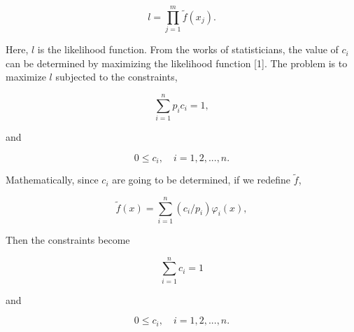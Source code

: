 \documentclass [18pt]{article}
\begin{document}
\begin{equation}
\label{eq10}
l = \prod\limits_{j = 1}^m {\widetilde{f}(x_j )} .
\end{equation}



Here, $l$ is the likelihood function. From the works of statisticians, the
value of $c_i $ can be determined by maximizing the likelihood function [1].
The problem is to maximize $l$ subjected to the constraints,


\begin{equation}
\label{eq11}
\sum\limits_{i = 1}^n {p_i c_i = 1} ,
\end{equation}



\noindent
and


\begin{equation}
\label{eq12}
0 \le c_i ,
\quad
i = 1,2,...,n.
\end{equation}



Mathematically, since $c_i $ are going to be determined, if we redefine
$\widetilde{f}$,


\begin{equation}
\label{eq13}
\widetilde{f}(x) = \sum\limits_{i = 1}^n {(c_i / p_i )} \varphi _i (x),
\end{equation}



Then the constraints become


\begin{equation}
\label{eq14}
\sum\limits_{i = 1}^n {c_i = 1}
\end{equation}



\noindent
and


\begin{equation}
\label{eq15}
0 \le c_i ,
\quad
i = 1,2,...,n.
\end{equation}
\end{document}
